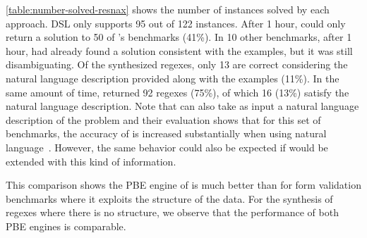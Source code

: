 \autoref{table:number-solved-resnax} shows the number of instances solved by each approach. \Forest{} DSL only supports 95 out of 122 instances. After 1 hour, \Forest{} could only return a solution to 50 of \Regel{}'s benchmarks (41\%). In 10 other benchmarks, after 1 hour, \Forest{} had already found a solution consistent with the examples, but it was still disambiguating. Of the synthesized regexes, only 13 are correct considering the natural language description provided along with the examples (11\%). In the same amount of time, \Regel{} returned 92 regexes (75\%), of which 16 (13\%) satisfy the natural language description. Note that \Regel{} can also take as input a natural language description of the problem and their evaluation shows that for this set of benchmarks, the accuracy of \Regel{} is increased substantially when using natural language~\cite{Regel20}. However, the same behavior could also be expected if \Forest{} would be extended with this kind of information.

This comparison shows the PBE engine of \Forest{} is much better than \Regel{} for form validation benchmarks where it exploits the structure of the data. For the synthesis of regexes where there is no structure, we observe that the performance of both PBE engines is comparable.

